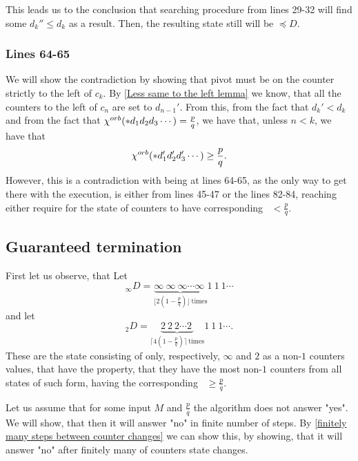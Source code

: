 This leads us to the conclusion that searching procedure from lines 
29-32 will find some $ d_k'' \leq d_k$ as a result. Then, the resulting state 
still will be $\preceq D$. 

\subsubsection{Lines 64-65}
We will show the contradiction by showing that pivot must be on 
the counter strictly to the left of $c_k$. 
By \ref{Less same to the left lemma} 
we know, that all the counters to the left of $c_n$ are set to $d_{n-1}'$. 
From this, from the fact that $d_k' < d_k$ and 
from the fact that ${\chi^{orb}(*d_1d_2d_3\cdots)} = \frac{p}{q}$, 
we have that, unless $n < k$, we have that 
\begin{equation}
{\chi^{orb}(*d_1'd_2'd_3'\cdots)} \geq \frac{p}{q}.
\end{equation}
However, this is a contradiction with being at lines 64-65, as 
the only way to get there with the execution, is either from lines 
45-47 or the lines 82-84, reaching either require for the state of counters to have 
corresponding \Eoc\ $<\frac{p}{q}$.


\subsection{Guaranteed termination}
First let us observe, that 
Let 
\begin{equation}
_\infty D = \underbrace{\infty\ \infty\ \infty\cdots 
\infty\ }_{\lfloor 2(1-\frac{p}{q})\rfloor\ \mathrm{times}}1\ 1\ 1\cdots
\end{equation}
and let 
\begin{equation}
_2D = \underbrace{2\ 2\ 2\cdots 
2\ }_{\lceil 4(1-\frac{p}{q})\rceil\ \mathrm{times}}1\ 1\ 1\cdots.
\end{equation}
These are the state consisting of only, respectively, $\infty$ and $2$ as a non-$1$ counters 
values, that have the property, that they have the most non-$1$ counters from all 
states of such form, having the corresponding \Eoc\ $\geq\frac{p}{q}$. 

Let us assume that for some input $M$ and $\frac{p}{q}$ the algorithm does not answer "yes". 
We will show, that then it will answer "no" in finite number of steps. By 
\ref{finitely many steps between counter changes} 
we can show this, by showing, that it will answer "no" after 
finitely many of counters state changes. 
